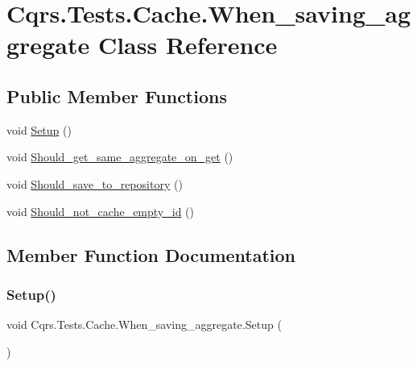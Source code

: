 \hypertarget{classCqrs_1_1Tests_1_1Cache_1_1When__saving__aggregate}{}\section{Cqrs.\+Tests.\+Cache.\+When\+\_\+saving\+\_\+aggregate Class Reference}
\label{classCqrs_1_1Tests_1_1Cache_1_1When__saving__aggregate}
\subsection*{Public Member Functions}
\begin{DoxyCompactItemize}
\item 
void \hyperlink{classCqrs_1_1Tests_1_1Cache_1_1When__saving__aggregate_ae3cdfe47b998fc0e76ffc9c9b125c441_ae3cdfe47b998fc0e76ffc9c9b125c441}{Setup} ()
\item 
void \hyperlink{classCqrs_1_1Tests_1_1Cache_1_1When__saving__aggregate_a7b8f4858d610b1db41b395516b1dc72b_a7b8f4858d610b1db41b395516b1dc72b}{Should\+\_\+get\+\_\+same\+\_\+aggregate\+\_\+on\+\_\+get} ()
\item 
void \hyperlink{classCqrs_1_1Tests_1_1Cache_1_1When__saving__aggregate_affc34709b78fecd91d555de42344d2ed_affc34709b78fecd91d555de42344d2ed}{Should\+\_\+save\+\_\+to\+\_\+repository} ()
\item 
void \hyperlink{classCqrs_1_1Tests_1_1Cache_1_1When__saving__aggregate_ae5d0ee92c05898125cc5046fbea0a654_ae5d0ee92c05898125cc5046fbea0a654}{Should\+\_\+not\+\_\+cache\+\_\+empty\+\_\+id} ()
\end{DoxyCompactItemize}


\subsection{Member Function Documentation}
\mbox{\label{classCqrs_1_1Tests_1_1Cache_1_1When__saving__aggregate_ae3cdfe47b998fc0e76ffc9c9b125c441_ae3cdfe47b998fc0e76ffc9c9b125c441}} 
\subsubsection{\texorpdfstring{Setup()}{Setup()}}
{\footnotesize\ttfamily void Cqrs.\+Tests.\+Cache.\+When\+\_\+saving\+\_\+aggregate.\+Setup (\begin{DoxyParamCaption}{ }\end{DoxyParamCaption})}

